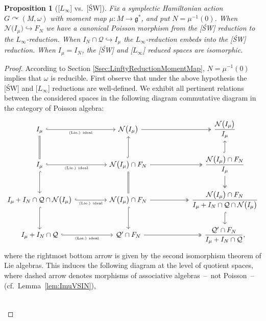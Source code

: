 \documentclass[pdftex]{sigma}
\numberwithin{equation}{section}
\newtheorem{Proposition}[Theorem]{Proposition}
 { \theoremstyle{definition}
\newtheorem{Definition}[Theorem]{Definition}
\newtheorem{Note}[Theorem]{Note}
\newtheorem{Example}[Theorem]{Example}
\newtheorem{Remark}[Theorem]{Remark} }
\DeclareMathOperator{\action}{\curvearrowright}
\newcommand{\g}{\mathfrak{g}}
\begin{document}
\begin{Proposition}[{[$L_\infty$] vs.\ [\'SW]}]\label{prop:LinftyVsSW}
	Fix a symplectic Hamiltonian action $G\action (M,\omega)$ with moment map $\mu\colon M\to\g^*$, and put $N=\mu^{-1}(0)$.
	When $\mathcal{N}\bigl(I_\mu\bigr)\hookrightarrow F_N$ we have a canonical Poisson morphism from the {\rm [\'SW]} reduction to the $L_\infty$-reduction.
	When $I_N\cap\mathcal{Q}\hookrightarrow I_\mu$ the $L_\infty$-reduction embeds into the {\rm [\'SW]} reduction.
	When $I_\mu=I_N$, the {\rm [\'SW]} and {\rm [$L_\infty$]} reduced spaces are isomorphic.
\end{Proposition}
\begin{proof}
	According to Section \ref{Ssec:LinftyReductionMomentMap}, $N=\mu^{-1}(0)$ implies that $\omega$ is reducible.
	First observe that under the above hypothesis the [\'SW] and [$L_\infty$] reductions are well-defined.
	We exhibit all pertinent relations between the considered spaces in the following diagram commutative diagram in the category of Poisson algebra:
	\[
		\begin{tikzcd}[column sep = large]
			I_{\mu} \ar[r,hook,"\text{\tiny (Lie.) ideal}"'] \ar[d,equal] &[1em]
			\mathcal{N}\bigl(I_\mu\bigr)\ar[r,two heads] &[2em]
			\dfrac{\mathcal{N}\bigl(I_\mu\bigr)}{I_\mu}
			\\
			I_{\mu} \ar[d,hook]\ar[r,hook,"\text{\tiny (Lie.) ideal}"'] &
			\mathcal{N}\bigl(I_\mu\bigr)\cap F_N \ar[u,hook]\ar[d,equal]\ar[r,two heads]&
			\dfrac{\mathcal{N}\bigl(I_\mu\bigr)\cap F_N}{I_{\mu}}		\ar[u,hook]\ar[d,two heads]
			\\
			I_{\mu} + I_N\cap \mathcal{Q}\cap \mathcal{N}\bigl(I_\mu\bigr) \ar[d,hook]\ar[r,hook,"\text{\tiny (Lie.) ideal}"'] &
			\mathcal{N}\bigl(I_\mu\bigr)\cap F_N \ar[d,hook]\ar[r,two heads]&
			\dfrac{\mathcal{N}\bigl(I_\mu\bigr)\cap F_N}{I_{\mu} + I_N\cap \mathcal{Q}\cap \mathcal{N}\bigl(I_\mu\bigr)}		\ar[d,hook]
			\\
			I_\mu+ I_N\cap\mathcal{Q} \ar[r,hook,"\text{\tiny (Lie.) ideal}"'] &
			\mathcal{Q}'\cap F_N \ar[r,two heads]&
			\dfrac{\mathcal{Q}'\cap F_N}{I_\mu+ I_N\cap\mathcal{Q}},
		\end{tikzcd}
	\]
	where the rightmost bottom arrow is given by the second isomorphism theorem of Lie algebras.
	This induces the following diagram at the level of quotient spaces, where dashed arrow denotes morphisms of associative algebras~--~not Poisson~-- (cf.\ Lemma~\ref{lem:ImuVSIN}),
	\[
		\begin{tikzcd}[column sep = large,
			cells={font=\everymath\expandafter{\the\everymath\displaystyle}},]

\end{tikzcd}\]
\end{proof}
\end{document}
